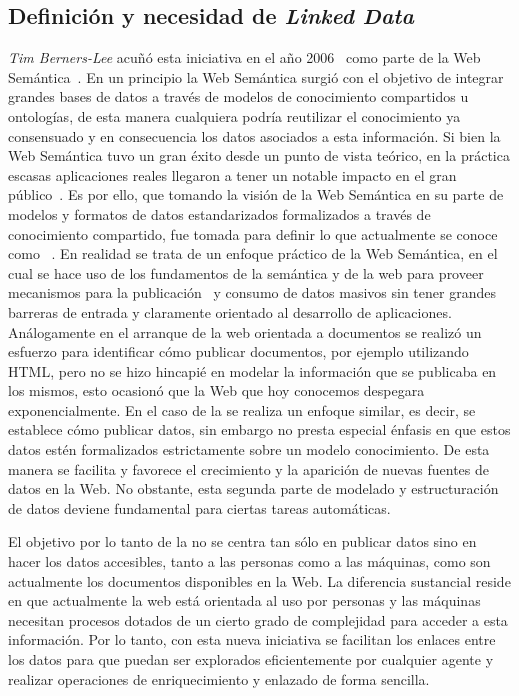 \subsection{Definición y necesidad de \textit{Linked Data}}\label{def-linkeddata}
\textit{Tim Berners-Lee} acuñó esta iniciativa en el año 2006~\cite{Berners-Lee-2006} como parte de la Web Semántica~\cite{Berners-Lee2001,WeavingTim,berners-lee06a}. 
En un principio la Web Semántica surgió con el objetivo de integrar grandes bases de datos a través de modelos de conocimiento compartidos u ontologías, de esta manera
cualquiera podría reutilizar el conocimiento ya consensuado y en consecuencia los datos asociados a esta información. Si bien
la Web Semántica tuvo un gran éxito desde un punto de vista teórico, en la práctica escasas aplicaciones reales llegaron a tener
un notable impacto en el gran público~\cite{sw-use-cases}. Es por ello, que tomando la visión de la Web Semántica en su parte de modelos y formatos de datos
estandarizados formalizados a través de conocimiento compartido, fue tomada para definir lo que actualmente se conoce como \linkeddata~\cite{linked-data}.
En realidad se trata de un enfoque práctico de la Web Semántica, en el cual
se hace uso de los fundamentos de la semántica y de la web para proveer mecanismos para la publicación~\cite{bizer07how,Berr08} y 
consumo de datos masivos sin tener grandes barreras de entrada y claramente orientado al desarrollo de aplicaciones. 
Análogamente en el arranque de la web orientada a documentos se realizó un esfuerzo para identificar cómo publicar documentos, por ejemplo utilizando HTML, pero no se hizo hincapié en
modelar la información que se publicaba en los mismos, esto ocasionó que la Web que hoy conocemos despegara exponencialmente. En el caso
de la \wode se realiza un enfoque similar, es decir, se establece cómo publicar datos, sin embargo no presta especial énfasis
 en que estos datos estén formalizados estrictamente sobre un modelo conocimiento. De esta manera se facilita y favorece el crecimiento y la aparición de nuevas fuentes
de datos en la Web. No obstante, esta segunda parte de modelado y estructuración de datos deviene fundamental para ciertas tareas
automáticas.

El objetivo por lo tanto de la \wode no se centra tan sólo en publicar datos sino en hacer los datos accesibles, tanto a las personas
como a las máquinas, como son actualmente los documentos disponibles en la Web. La diferencia sustancial reside en que actualmente
la web está orientada al uso por personas y las máquinas necesitan procesos dotados de un cierto grado de complejidad para acceder a esta información.
Por lo tanto, con esta nueva iniciativa se facilitan los enlaces entre los datos para que puedan ser explorados eficientemente 
por cualquier agente y realizar operaciones de enriquecimiento y enlazado de forma sencilla.

